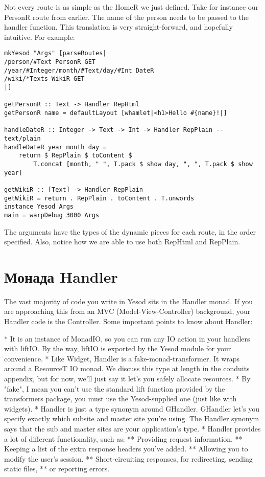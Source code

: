 Not every route is as simple as the HomeR we just defined. Take for
instance our PersonR route from earlier. The name of the person needs
to be passed to the handler function. This translation is very
straight-forward, and hopefully intuitive. For example:

\begin{lstlisting}
mkYesod "Args" [parseRoutes|
/person/#Text PersonR GET
/year/#Integer/month/#Text/day/#Int DateR
/wiki/*Texts WikiR GET
|]

getPersonR :: Text -> Handler RepHtml
getPersonR name = defaultLayout [whamlet|<h1>Hello #{name}!|]

handleDateR :: Integer -> Text -> Int -> Handler RepPlain -- text/plain
handleDateR year month day =
    return $ RepPlain $ toContent $
        T.concat [month, " ", T.pack $ show day, ", ", T.pack $ show year]

getWikiR :: [Text] -> Handler RepPlain
getWikiR = return . RepPlain . toContent . T.unwords
instance Yesod Args
main = warpDebug 3000 Args
\end{lstlisting}

The arguments have the types of the dynamic pieces for each route, in
the order specified. Also, notice how we are able to use both RepHtml
and RepPlain.

\section{Монада Handler}

The vast majority of code you write in Yesod sits in the Handler
monad. If you are approaching this from an MVC (Model-View-Controller)
background, your Handler code is the Controller. Some important points
to know about Handler:

* It is an instance of MonadIO, so you can run any IO action in your
handlers with liftIO. By the way, liftIO is exported by the Yesod
module for your convenience.
* Like Widget, Handler is a fake-monad-transformer. It wraps around a
ResourceT IO monad. We discuss this type at length in the conduits
appendix, but for now, we'll just say it let's you safely allocate
resources.
* By "fake", I mean you can't use the standard lift function provided
by the transformers package, you must use the Yesod-supplied one (just
like with widgets).
* Handler is just a type synonym around GHandler. GHandler let's you
specify exactly which subsite and master site you're using. The
Handler synonym says that the sub and master sites are your
application's type.
* Handler provides a lot of different functionality, such as:
** Providing request information.
** Keeping a list of the extra response headers you've added.
** Allowing you to modify the user's session.
** Short-circuiting responses, for redirecting, sending static files,
** or reporting errors.

